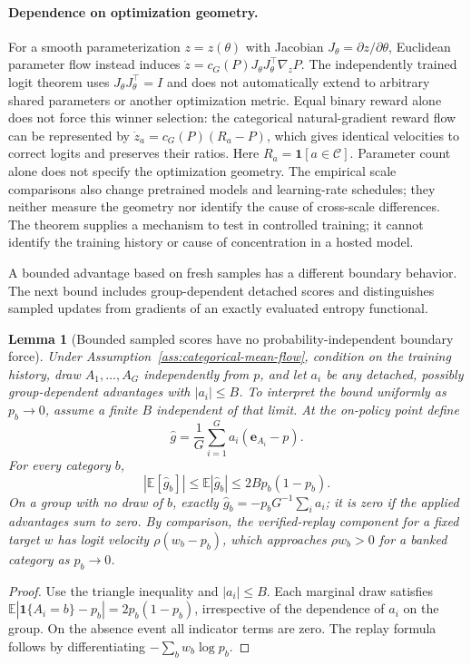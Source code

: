 \documentclass{article}
\newcommand{\1}{\mathbf 1}
\newcommand{\E}{\mathbb E}
\newtheorem{lemma}{Lemma}[section]
\theoremstyle{remark}
\theoremstyle{definition}
\theoremstyle{plain}
\begin{document}
\paragraph{Dependence on optimization geometry.}
For a smooth parameterization $z=z(\theta)$ with Jacobian
$J_\theta=\partial z/\partial\theta$, Euclidean parameter flow instead
induces $\dot z=c_G(P)J_\theta J_\theta^\top\nabla_zP$. The independently
trained logit theorem uses $J_\theta J_\theta^\top=I$ and does not automatically
extend to arbitrary shared parameters or another optimization metric. Equal
binary reward alone does not force this winner selection: the categorical
natural-gradient reward flow can be represented by
$\dot z_a=c_G(P)(R_a-P)$, which gives identical velocities to correct logits
and preserves their ratios. Here $R_a=\1[a\in\mathcal C]$.
Parameter count alone does not specify the optimization geometry. The empirical
scale
comparisons also change pretrained models and learning-rate schedules; they
neither measure the geometry nor identify the cause of cross-scale differences.
The theorem supplies a mechanism to test in controlled training; it cannot
identify the training history or cause of concentration in a hosted model.

A bounded advantage based on fresh samples has a different boundary behavior.
The next bound includes group-dependent detached scores and distinguishes
sampled updates from gradients of an exactly evaluated entropy functional.

\begin{lemma}[Bounded sampled scores have no probability-independent boundary force]
\label{lem:sampled-score-bound}
Under Assumption~\ref{ass:categorical-mean-flow}, condition on the training history, draw
$A_1,\ldots,A_G$ independently from $p$, and let $a_i$ be any detached,
possibly group-dependent advantages with $|a_i|\le B$. To interpret the
bound uniformly as $p_b\to0$, assume a finite $B$ independent of that limit.
At the on-policy point define
\[
 \widehat g=\frac1G\sum_{i=1}^G a_i(\mathbf e_{A_i}-p).
\]
For every category $b$,
\[
 |\E[\widehat g_b]|\le\E|\widehat g_b|
 \le 2B p_b(1-p_b).
\]
On a group with no draw of $b$, exactly
$\widehat g_b=-p_bG^{-1}\sum_i a_i$; it is zero if the applied advantages
sum to zero. By comparison, the verified-replay component for a fixed target
$w$ has logit velocity $\rho(w_b-p_b)$, which approaches $\rho w_b>0$
for a banked category as $p_b\to0$.
\end{lemma}

\begin{proof}
Use the triangle inequality and $|a_i|\le B$. Each marginal draw satisfies
$\E|\1\{A_i=b\}-p_b|=2p_b(1-p_b)$, irrespective of the dependence of
$a_i$ on the group. On the absence event all indicator terms are zero.
The replay formula follows by differentiating $-\sum_b w_b\log p_b$.
\end{proof}
\end{document}
